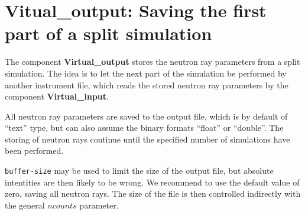 \section{Vitual\_output: Saving the first part of a split simulation}
\label{virtual_output}


The component {\bf Virtual\_output} stores the neutron ray parameters
from a split simulation. The idea is to let the
next part of the simulation be performed by another instrument file,
which reads the stored neutron ray
parameters by the component {\bf Virtual\_input}.

All neutron ray parameters are saved to the output file, which is by default
of ``text'' type, but can also assume the binary formats
``float'' or ``double''. The storing of neutron rays continue until the
specified number of simulations have been performed.

\verb+buffer-size+ may be used to limit the size of the output file, but 
absolute intentities are then likely to be wrong. 
We recommend to use the default value of zero, saving all neutron rays. 
The size of the file is then controlled indirectly with 
the general $ncounts$ parameter.
